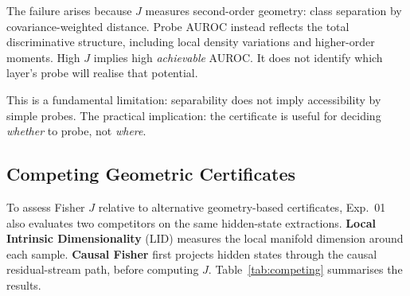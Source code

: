 \documentclass[onecolumn]{jmlr}
\begin{document}
\begin{remark}
The failure arises because $J$ measures second-order geometry: class
separation by covariance-weighted distance. Probe AUROC instead reflects
the total discriminative structure, including local density variations
and higher-order moments. High $J$ implies high \emph{achievable} AUROC.
It does not identify which layer's probe will realise that potential.
\end{remark}

This is a fundamental limitation: separability does not imply
accessibility by simple probes. The practical implication: the
certificate is useful for deciding \emph{whether} to probe, not
\emph{where}.

\subsection{Competing Geometric Certificates}
\label{sec:cert-competing}

To assess Fisher $J$ relative to alternative geometry-based
certificates, Exp.~01 also evaluates two competitors on the same
hidden-state extractions. \textbf{Local Intrinsic Dimensionality} (LID)
measures the local manifold dimension around each sample.
\textbf{Causal Fisher} first projects hidden states through the causal
residual-stream path, before computing $J$. Table~\ref{tab:competing}
summarises the results.

\begin{table}[!htbp]
\centering
\caption{Competing geometric certificates (Exp.~01). LID peaks at the
  embedding layer (L0) for both models, indicating that intrinsic
  dimensionality does not locate separability structure.
  Causal Fisher reduces $J$ by $25\%$ on Qwen and fails entirely on
  GPT-2~Medium.}
\label{tab:competing}
\small
\setlength{\tabcolsep}{3pt}
\end{table}
\end{document}
